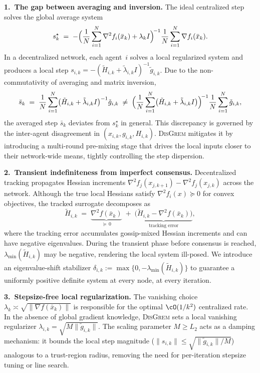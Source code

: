 \documentclass[review,onefignum,onetabnum]{siamart171218}
\begin{document}
	\noindent\textbf{1.\ The gap between averaging and inversion.}
	The ideal centralized step solves the global average system
	\[
	s_k^{\star}
	\;=\;
	-\Bigl(\frac{1}{N}\sum_{i=1}^{N}\nabla^2 f_i(\bar x_k)
	       +\lambda_k I\Bigr)^{\!-1}
	\frac{1}{N}\sum_{i=1}^{N}\nabla f_i(\bar x_k).
	\]
	In a decentralized network, each agent~$i$ solves a local regularized
	system and produces a local step
	$s_{i,k}=-(\tilde H_{i,k}+\tilde\lambda_{i,k}I)^{-1}\tilde g_{i,k}$.
	Due to the non-commutativity of averaging and matrix inversion,
	\[
	\bar s_k
	\;=\;
	\frac{1}{N}\sum_{i=1}^{N}
	  \bigl(\tilde H_{i,k}+\tilde\lambda_{i,k}I\bigr)^{-1}\tilde g_{i,k}
	\;\neq\;
	\Bigl(\frac{1}{N}\sum_{i=1}^{N}
	  \bigl(\tilde H_{i,k}+\tilde\lambda_{i,k}I\bigr)\Bigr)^{\!-1}
	\frac{1}{N}\sum_{i=1}^{N}\tilde g_{i,k},
	\]
	the averaged step $\bar s_k$ deviates from $s_k^{\star}$ in general.
	This discrepancy is governed by the inter-agent disagreement in
	$(x_{i,k},g_{i,k},H_{i,k})$.
	\textsc{DisGrem} mitigates it by introducing a multi-round
	pre-mixing stage that drives the local inputs closer to their
	network-wide means, tightly controlling the step dispersion.

	\noindent\textbf{2.\ Transient indefiniteness from imperfect consensus.}
	Decentralized tracking propagates Hessian increments
	$\nabla^2 f_j(x_{j,k+1})-\nabla^2 f_j(x_{j,k})$ across
	the network.
	Although the true local Hessians satisfy $\nabla^2 f_i(x)\succeq 0$
	for convex objectives, the tracked surrogate decomposes as
	\[
	\tilde H_{i,k}
	\;=\;
	\underbrace{\nabla^2 f(\bar x_k)}_{\succeq\,0}
	\;+\;
	\underbrace{\bigl(\tilde H_{i,k}-\nabla^2 f(\bar x_k)\bigr)}_{\text{tracking error}},
	\]
	where the tracking error accumulates gossip-mixed Hessian increments
	and can have negative eigenvalues.
	During the transient phase before consensus is reached,
	$\lambda_{\min}(\tilde H_{i,k})$ may be negative, rendering
	the local system ill-posed.
	We introduce an eigenvalue-shift stabilizer
	$\delta_{i,k}:=\max\{0,-\lambda_{\min}(\tilde H_{i,k})\}$ to
	guarantee a uniformly positive definite system at every node,
	at every iteration.

	\noindent\textbf{3.\ Stepsize-free local regularization.}
	The vanishing choice
	$\lambda_k\asymp\sqrt{\|\nabla f(\bar x_k)\|}$ is responsible
	for the optimal $\cO(1/k^2)$ centralized rate.
	In the absence of global gradient knowledge, \textsc{DisGrem}
	sets a local vanishing regularizer
	$\lambda_{i,k}=\sqrt{M\|\tilde g_{i,k}\|}$.
	The scaling parameter $M\ge L_2$ acts as a damping
	mechanism: it bounds the local step magnitude
	($\|s_{i,k}\|\le\sqrt{\|\tilde g_{i,k}\|/M}$) analogous to a
	trust-region radius, removing the need for
	per-iteration stepsize tuning or line search.
	
\end{document}
